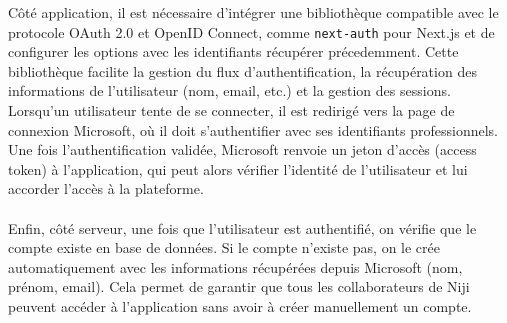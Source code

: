 \documentclass[12pt]{article}
\begin{document}
\noindent
Côté application, il est nécessaire d’intégrer une bibliothèque compatible avec le protocole OAuth 2.0 et OpenID Connect, comme \texttt{next-auth} pour Next.js et de configurer les options avec les identifiants récupérer précedemment. Cette bibliothèque facilite la gestion du flux d’authentification, la récupération des informations de l’utilisateur (nom, email, etc.) et la gestion des sessions. Lorsqu’un utilisateur tente de se connecter, il est redirigé vers la page de connexion Microsoft, où il doit s’authentifier avec ses identifiants professionnels. Une fois l’authentification validée, Microsoft renvoie un jeton d’accès (access token) à l’application, qui peut alors vérifier l’identité de l’utilisateur et lui accorder l’accès à la plateforme.
\\\\
Enfin, côté serveur, une fois que l'utilisateur est authentifié, on vérifie que le compte existe en base de données. Si le compte n'existe pas, on le crée automatiquement avec les informations récupérées depuis Microsoft (nom, prénom, email). Cela permet de garantir que tous les collaborateurs de Niji peuvent accéder à l'application sans avoir à créer manuellement un compte.
\end{document}
